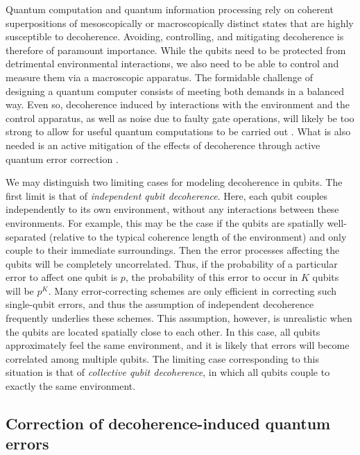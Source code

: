 \documentclass[aps,pra,reprint,amsmath,amssymb,showpacs,nofootinbib,floatfix,onecolumn,12pt]{revtex4-1}
\begin{document}
Quantum computation and quantum information processing rely on coherent superpositions of mesoscopically or macroscopically distinct states that are highly susceptible to decoherence. Avoiding, controlling, and mitigating decoherence is therefore of paramount importance. While the qubits need to be protected from detrimental environmental interactions, we also need to be able to control and measure them via a macroscopic apparatus. The formidable challenge of designing a quantum computer consists of meeting both demands in a balanced way. Even so, decoherence induced by interactions with the environment and the control apparatus, as well as noise due to faulty gate operations, will likely be too strong to allow for useful quantum computations to be carried out \cite{Miquel:1997:zz,Miquel:1996:ra}. What is also needed is an active mitigation of the effects of decoherence through active quantum error correction \cite{Steane:1996:cd,Shor:1995:rx,Steane:2001:dx,Knill:2002:rx,Nielsen:2000:tt}.

We may distinguish two limiting cases for modeling decoherence in qubits. The first limit is that of \emph{independent qubit decoherence}. Here, each qubit couples independently to its own environment, without any interactions between these environments. For example, this may be the case if the qubits are spatially well-separated (relative to the typical coherence length of the environment) and only couple to their immediate surroundings. Then the error processes affecting the qubits will be completely uncorrelated. Thus, if the probability of a particular error to affect one qubit is $p$, the probability of this error to occur in $K$ qubits will be $p^K$. Many error-correcting schemes are only efficient in correcting such single-qubit errors, and thus the assumption of independent decoherence frequently underlies these schemes. This assumption, however, is unrealistic when the qubits are located spatially close to each other. In this case, all qubits approximately feel the same environment, and it is likely that errors will become correlated among multiple qubits. The limiting case corresponding to this situation is that of \emph{collective qubit decoherence}, in which all qubits couple to exactly the same environment.

\subsection{\label{sec:corr-decoh-induc}Correction of decoherence-induced quantum errors}
\end{document}
